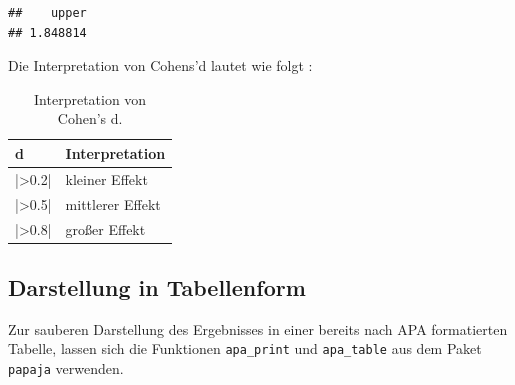\documentclass[
]{book}
\newenvironment{Shaded}{\begin{snugshade}}{\end{snugshade}}
\newcommand{\AttributeTok}[1]{\textcolor[rgb]{0.13,0.29,0.53}{#1}}
\newcommand{\DecValTok}[1]{\textcolor[rgb]{0.00,0.00,0.81}{#1}}
\newcommand{\FloatTok}[1]{\textcolor[rgb]{0.00,0.00,0.81}{#1}}
\newcommand{\FunctionTok}[1]{\textcolor[rgb]{0.13,0.29,0.53}{\textbf{#1}}}
\newcommand{\NormalTok}[1]{#1}
\newcommand{\OtherTok}[1]{\textcolor[rgb]{0.56,0.35,0.01}{#1}}
\newcommand{\SpecialCharTok}[1]{\textcolor[rgb]{0.81,0.36,0.00}{\textbf{#1}}}
\newcommand{\StringTok}[1]{\textcolor[rgb]{0.31,0.60,0.02}{#1}}
\begin{document}
\begin{verbatim}
##    upper 
## 1.848814
\end{verbatim}

Die Interpretation von Cohens'd lautet wie folgt \citet{cohen1992quantitative}:

\begin{table}[tbp]

\begin{center}
\begin{threeparttable}

\caption{\label{tab:unnamed-chunk-227}Interpretation von Cohen's d.}

\begin{tabular}{ll}
\toprule
d & \multicolumn{1}{c}{Interpretation}\\
\midrule
|>0.2| & kleiner Effekt\\
|>0.5| & mittlerer Effekt\\
|>0.8| & großer Effekt\\
\bottomrule
\end{tabular}

\end{threeparttable}
\end{center}

\end{table}

\subsection{Darstellung in Tabellenform}\label{darstellung-in-tabellenform}

Zur sauberen Darstellung des Ergebnisses in einer bereits nach APA formatierten Tabelle, lassen sich die Funktionen \texttt{apa\_print} und \texttt{apa\_table} aus dem Paket \texttt{papaja} verwenden.

\begin{Shaded}
\end{Shaded}
\end{document}
